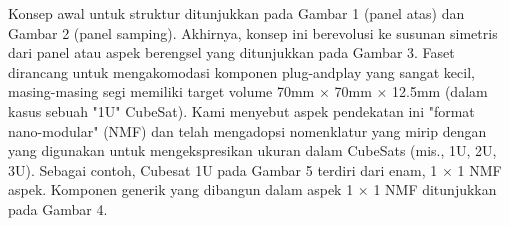 Konsep awal untuk struktur ditunjukkan pada Gambar 1 (panel atas) dan Gambar 2 (panel samping). Akhirnya, konsep ini berevolusi ke susunan simetris dari panel atau aspek berengsel yang ditunjukkan pada Gambar 3. Faset dirancang untuk mengakomodasi komponen plug-andplay yang sangat kecil, masing-masing segi memiliki target volume 70mm × 70mm × 12.5mm (dalam kasus sebuah "1U" CubeSat). Kami menyebut aspek pendekatan ini "format nano-modular" (NMF) dan telah mengadopsi nomenklatur yang mirip dengan yang digunakan untuk mengekspresikan ukuran dalam CubeSats (mis., 1U, 2U, 3U). Sebagai contoh, Cubesat 1U pada Gambar 5 terdiri dari enam, 1 × 1 NMF aspek. Komponen generik yang dibangun dalam aspek 1 × 1 NMF ditunjukkan pada Gambar 4.